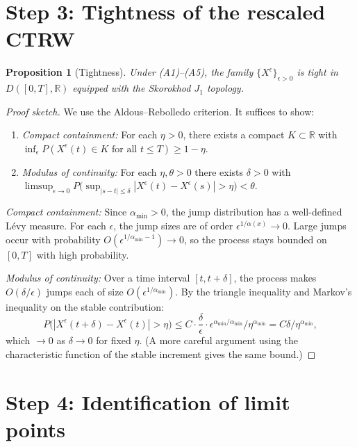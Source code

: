 \documentclass{amsart}
\newtheorem{proposition}[theorem]{Proposition}
\theoremstyle{definition}
\begin{document}
\section{Step 3: Tightness of the rescaled CTRW}

\begin{proposition}[Tightness]
\label{prop:tight}
Under (A1)--(A5), the family $\{X^\epsilon\}_{\epsilon > 0}$ is tight in
$D([0,T], \mathbb{R})$ equipped with the Skorokhod $J_1$ topology.
\end{proposition}

\begin{proof}[Proof sketch]
We use the Aldous--Rebolledo criterion. It suffices to show:
\begin{enumerate}
    \item[(i)] \emph{Compact containment:} For each $\eta > 0$, there exists a compact
               $K \subset \mathbb{R}$ with $\inf_\epsilon P(X^\epsilon(t) \in K \text{ for all } t \leq T) \geq 1-\eta$.
    \item[(ii)] \emph{Modulus of continuity:} For each $\eta, \theta > 0$ there exists
               $\delta > 0$ with
               $\limsup_{\epsilon \to 0} P\bigl(\sup_{|s-t| \leq \delta} |X^\epsilon(t)-X^\epsilon(s)| > \eta\bigr) < \theta$.
\end{enumerate}

\emph{Compact containment:} Since $\alpha_{\min} > 0$, the jump distribution has a
well-defined L\'evy measure. For each $\epsilon$, the jump sizes are of order
$\epsilon^{1/\alpha(x)} \to 0$. Large jumps occur with probability $O(\epsilon^{1/\alpha_{\min}-1})
\to 0$, so the process stays bounded on $[0,T]$ with high probability.

\emph{Modulus of continuity:} Over a time interval $[t, t+\delta]$, the process makes
$O(\delta/\epsilon)$ jumps each of size $O(\epsilon^{1/\alpha_{\min}})$. By the triangle
inequality and Markov's inequality on the stable contribution:
\[
    P\bigl(|X^\epsilon(t+\delta) - X^\epsilon(t)| > \eta\bigr)
    \leq C \cdot \frac{\delta}{\epsilon} \cdot \epsilon^{\alpha_{\min}/\alpha_{\min}} / \eta^{\alpha_{\min}}
    = C \delta / \eta^{\alpha_{\min}},
\]
which $\to 0$ as $\delta \to 0$ for fixed $\eta$. (A more careful argument using the
characteristic function of the stable increment gives the same bound.)
\end{proof}

\section{Step 4: Identification of limit points}
\end{document}
